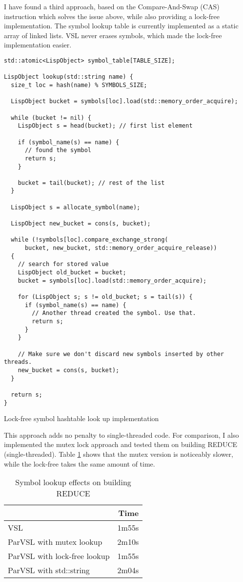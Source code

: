 I have found a third approach, based on the Compare-And-Swap (CAS) instruction which solves the issue
above, while also providing a lock-free implementation. The symbol lookup table is currently implemented
as a static array of linked lists. VSL never erases symbols, which made the lock-free implementation easier.

\begin{code}
\begin{verbatim}
std::atomic<LispObject> symbol_table[TABLE_SIZE];

LispObject lookup(std::string name) {
  size_t loc = hash(name) % SYMBOLS_SIZE;

  LispObject bucket = symbols[loc].load(std::memory_order_acquire);

  while (bucket != nil) {
    LispObject s = head(bucket); // first list element

    if (symbol_name(s) == name) {
      // found the symbol
      return s;
    }

    bucket = tail(bucket); // rest of the list
  }

  LispObject s = allocate_symbol(name);

  LispObject new_bucket = cons(s, bucket);

  while (!symbols[loc].compare_exchange_strong(
      bucket, new_bucket, std::memory_order_acquire_release))
  {
    // search for stored value
    LispObject old_bucket = bucket;
    bucket = symbols[loc].load(std::memory_order_acquire);

    for (LispObject s; s != old_bucket; s = tail(s)) {
      if (symbol_name(s) == name) {
        // Another thread created the symbol. Use that.
        return s;
      }
    }

    // Make sure we don't discard new symbols inserted by other threads.
    new_bucket = cons(s, bucket);
  }

  return s;
}
\end{verbatim}
\caption{Lock-free symbol hashtable look up implementation}
\label{code:lockfree}
\end{code}

This approach adds no penalty to single-threaded
code. For comparison, I also implemented the mutex lock approach and tested
them on building REDUCE (single-threaded). Table \ref{tab:lockfree} shows that the mutex
version is noticeably slower, while the lock-free takes the same amount of time.

\begin{table}[H]
  \centering
  \begin{tabular}{lr}
                               & Time \\
  \hline
  VSL                          & 1m55s \\
  ParVSL with mutex lookup     & 2m10s \\
  ParVSL with lock-free lookup & 1m55s \\
  ParVSL with std::string      & 2m04s
  \end{tabular}
  \caption{Symbol lookup effects on building REDUCE}
  \label{tab:lockfree}
\end{table}

